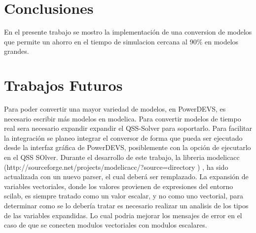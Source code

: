
\section{Conclusiones}

En el presente trabajo se mostro la implementación de una conversion de modelos que permite un ahorro en el tiempo de simulacion cercana al 90\% en modelos grandes.

\section{Trabajos Futuros}
Para poder convertir una mayor variedad de modelos, en PowerDEVS, es necesario escribir más modelos en modelica.
Para convertir modelos de tiempo real sera necesario expandir expandir el QSS-Solver para soportarlo.
Para facilitar la integración se planeo integrar el conversor de forma que pueda ser ejecutado desde la interfaz gráfica de PowerDEVS, posiblemente con la opción de ejecutarlo en el QSS SOlver.
Durante el desarrollo de este trabajo, la libreria modelicacc (http://sourceforge.net/projects/modelicacc/?source=directory ) , ha sido actualizada con un nuevo parser, el cual deberá ser remplazado.
La expansión de variables vectoriales, donde los valores provienen de expresiones del entorno scilab, es siempre tratado como un valor escalar, y no como uno vectorial, para determinar como se lo debería tratar es necesario realizar un analisis de los tipos de las variables expandidas. Lo cual podria mejorar los mensajes de error en el caso de que se conecten modulos vectoriales con modulos escalares.
